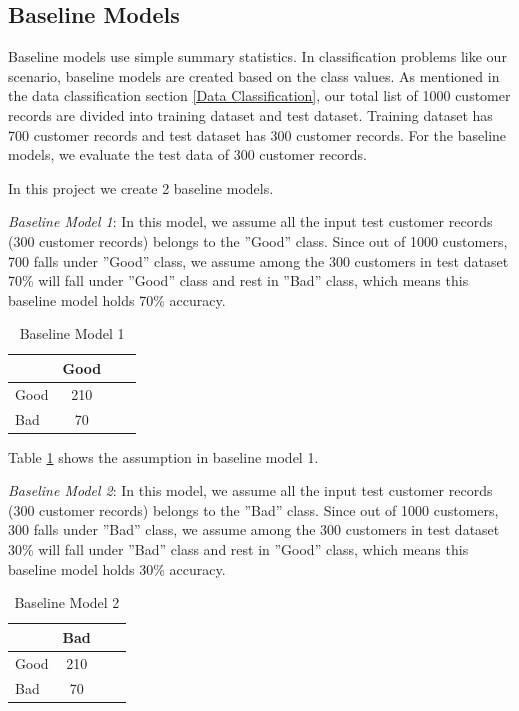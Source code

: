 \documentclass[sigconf]{acmart}
\begin{document}
\subsection{Baseline Models}

Baseline models use simple summary statistics. In classification problems like our scenario, baseline models are created based on the class values. As mentioned in the data classification section \ref{Data Classification}, our total list of 1000 customer records are divided into training dataset and test dataset. Training dataset has 700 customer records and test dataset has 300 customer records. For the baseline models, we evaluate the test data of 300 customer records.

In this project we create 2 baseline models. 

\textit{Baseline Model 1}: In this model, we assume all the input test customer records (300 customer records) belongs to the ''Good'' class. Since out of 1000 customers, 700 falls under ''Good'' class, we assume among the 300 customers in test dataset 70\% will fall under ''Good'' class and rest in ''Bad'' class, which means this baseline model holds 70\% accuracy. 

\begin{table}
  \caption{Baseline Model 1}
  \label{tab:table4}
  \begin{tabular}{lclc}
    \toprule
     & Good\\
    \midrule
    Good& 210\\
    Bad& 70\\
    \bottomrule
  \end{tabular}
\end{table}

Table \ref{tab:table4} shows the assumption in baseline model 1.

\textit{Baseline Model 2}: In this model, we assume all the input test customer records (300 customer records) belongs to the ''Bad'' class. Since out of 1000 customers, 300 falls under ''Bad'' class, we assume among the 300 customers in test dataset 30\% will fall under ''Bad'' class and rest in ''Good'' class, which means this baseline model holds 30\% accuracy. 

\begin{table}
  \caption{Baseline Model 2}
  \label{tab:table5}
  \begin{tabular}{lclc}
    \toprule
     & Bad\\
    \midrule
    Good& 210\\
    Bad& 70\\
    \bottomrule
  \end{tabular}
\end{table}
\end{document}
